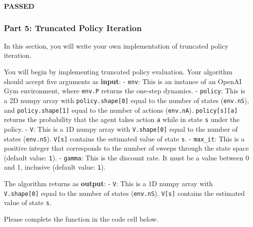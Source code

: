 \documentclass[11pt]{article}
\begin{document}
    \textbf{{PASSED}}

    
    \subsubsection{Part 5: Truncated Policy
Iteration}\label{part-5-truncated-policy-iteration}

In this section, you will write your own implementation of truncated
policy iteration.

You will begin by implementing truncated policy evaluation. Your
algorithm should accept five arguments as \textbf{input}: -
\texttt{env}: This is an instance of an OpenAI Gym environment, where
\texttt{env.P} returns the one-step dynamics. - \texttt{policy}: This is
a 2D numpy array with \texttt{policy.shape{[}0{]}} equal to the number
of states (\texttt{env.nS}), and \texttt{policy.shape{[}1{]}} equal to
the number of actions (\texttt{env.nA}). \texttt{policy{[}s{]}{[}a{]}}
returns the probability that the agent takes action \texttt{a} while in
state \texttt{s} under the policy. - \texttt{V}: This is a 1D numpy
array with \texttt{V.shape{[}0{]}} equal to the number of states
(\texttt{env.nS}). \texttt{V{[}s{]}} contains the estimated value of
state \texttt{s}. - \texttt{max\_it}: This is a positive integer that
corresponds to the number of sweeps through the state space (default
value: \texttt{1}). - \texttt{gamma}: This is the discount rate. It must
be a value between 0 and 1, inclusive (default value: \texttt{1}).

The algorithm returns as \textbf{output}: - \texttt{V}: This is a 1D
numpy array with \texttt{V.shape{[}0{]}} equal to the number of states
(\texttt{env.nS}). \texttt{V{[}s{]}} contains the estimated value of
state \texttt{s}.

Please complete the function in the code cell below.
\end{document}
